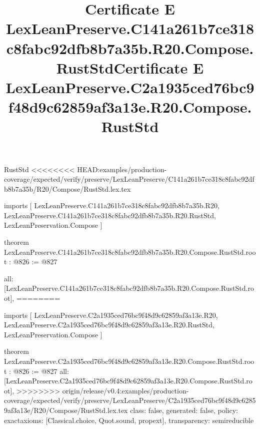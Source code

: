 \begin{lexlean}{RustStd}
<<<<<<<< HEAD:examples/production-coverage/expected/verify/preserve/LexLeanPreserve/C141a261b7ce318c8fabc92dfb8b7a35b/R20/Compose/RustStd.lex.tex
\title{Certificate E LexLeanPreserve.C141a261b7ce318c8fabc92dfb8b7a35b.R20.Compose.RustStd}
\begin{coremodule}
imports [
  LexLeanPreserve.C141a261b7ce318c8fabc92dfb8b7a35b.R20,
  LexLeanPreserve.C141a261b7ce318c8fabc92dfb8b7a35b.R20.RustStd,
  LexLeanPreservation.Compose
]

theorem LexLeanPreserve.C141a261b7ce318c8fabc92dfb8b7a35b.R20.Compose.RustStd.root : @826 := @827 {
  all: [LexLeanPreserve.C141a261b7ce318c8fabc92dfb8b7a35b.R20.Compose.RustStd.root],
========
\title{Certificate E LexLeanPreserve.C2a1935ced76bc9f48d9c62859af3a13e.R20.Compose.RustStd}
\begin{coremodule}
imports [
  LexLeanPreserve.C2a1935ced76bc9f48d9c62859af3a13e.R20,
  LexLeanPreserve.C2a1935ced76bc9f48d9c62859af3a13e.R20.RustStd,
  LexLeanPreservation.Compose
]

theorem LexLeanPreserve.C2a1935ced76bc9f48d9c62859af3a13e.R20.Compose.RustStd.root : @826 := @827 {
  all: [LexLeanPreserve.C2a1935ced76bc9f48d9c62859af3a13e.R20.Compose.RustStd.root],
>>>>>>>> origin/release/v0.4:examples/production-coverage/expected/verify/preserve/LexLeanPreserve/C2a1935ced76bc9f48d9c62859af3a13e/R20/Compose/RustStd.lex.tex
  class: false,
  generated: false,
  policy: exact{axioms: [Classical.choice, Quot.sound, propext]},
  transparency: semireducible
}


\end{coremodule}}
\end{coremodule}
\end{lexlean}
